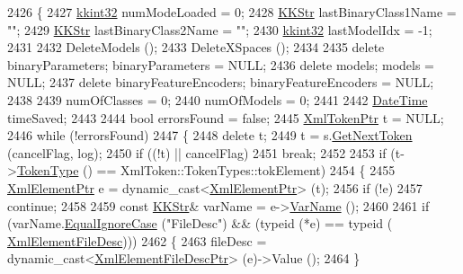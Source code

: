 \begin{DoxyCode}
2426 \{
2427   \hyperlink{namespace_k_k_b_a8fa4952cc84fda1de4bec1fbdd8d5b1b}{kkint32}  numModeLoaded = 0;
2428   \hyperlink{class_k_k_b_1_1_k_k_str}{KKStr}    lastBinaryClass1Name = \textcolor{stringliteral}{""};
2429   \hyperlink{class_k_k_b_1_1_k_k_str}{KKStr}    lastBinaryClass2Name = \textcolor{stringliteral}{""};
2430   \hyperlink{namespace_k_k_b_a8fa4952cc84fda1de4bec1fbdd8d5b1b}{kkint32}  lastModelIdx = -1;
2431 
2432   DeleteModels ();
2433   DeleteXSpaces ();
2434 
2435   \textcolor{keyword}{delete}  binaryParameters;       binaryParameters      = NULL;
2436   \textcolor{keyword}{delete}  models;                 models                = NULL;
2437   \textcolor{keyword}{delete}  binaryFeatureEncoders;  binaryFeatureEncoders = NULL;
2438 
2439   numOfClasses = 0;
2440   numOfModels  = 0;
2441 
2442   \hyperlink{class_k_k_b_1_1_date_time}{DateTime}  timeSaved;
2443 
2444   \textcolor{keywordtype}{bool}  errorsFound = \textcolor{keyword}{false};
2445   \hyperlink{class_k_k_b_1_1_xml_token}{XmlTokenPtr}  t = NULL;
2446   \textcolor{keywordflow}{while}  (!errorsFound)
2447   \{
2448     \textcolor{keyword}{delete}  t;
2449     t = s.\hyperlink{class_k_k_b_1_1_xml_stream_a87cc738b05c666cf5d5c25beaab477b4}{GetNextToken} (cancelFlag, log);
2450     \textcolor{keywordflow}{if}  ((!t)  ||  cancelFlag)
2451       \textcolor{keywordflow}{break};
2452 
2453     \textcolor{keywordflow}{if}  (t->\hyperlink{class_k_k_b_1_1_xml_token_ae98e2c1a798882647578cae4adcd7176}{TokenType} () == XmlToken::TokenTypes::tokElement)
2454     \{
2455       \hyperlink{class_k_k_b_1_1_xml_element}{XmlElementPtr} e = \textcolor{keyword}{dynamic\_cast<}\hyperlink{class_k_k_b_1_1_xml_element}{XmlElementPtr}\textcolor{keyword}{>} (t);
2456       \textcolor{keywordflow}{if}  (!e)
2457         \textcolor{keywordflow}{continue};
2458 
2459       \textcolor{keyword}{const} \hyperlink{class_k_k_b_1_1_k_k_str}{KKStr}&  varName = e->\hyperlink{class_k_k_b_1_1_xml_element_aef57cf00be66a3a387ce849b35125f51}{VarName} ();
2460 
2461       \textcolor{keywordflow}{if}  (varName.\hyperlink{class_k_k_b_1_1_k_k_str_a562f9696417c53f66bc4088eac072ab5}{EqualIgnoreCase} (\textcolor{stringliteral}{"FileDesc"})  &&  (\textcolor{keyword}{typeid} (*e) == \textcolor{keyword}{typeid} (
      \hyperlink{class_k_k_m_l_l_1_1_xml_element_file_desc}{XmlElementFileDesc})))
2462       \{
2463         fileDesc = \textcolor{keyword}{dynamic\_cast<}\hyperlink{class_k_k_m_l_l_1_1_xml_element_file_desc}{XmlElementFileDescPtr}\textcolor{keyword}{>} (e)->Value ();
2464       \}

\end{DoxyCode}
